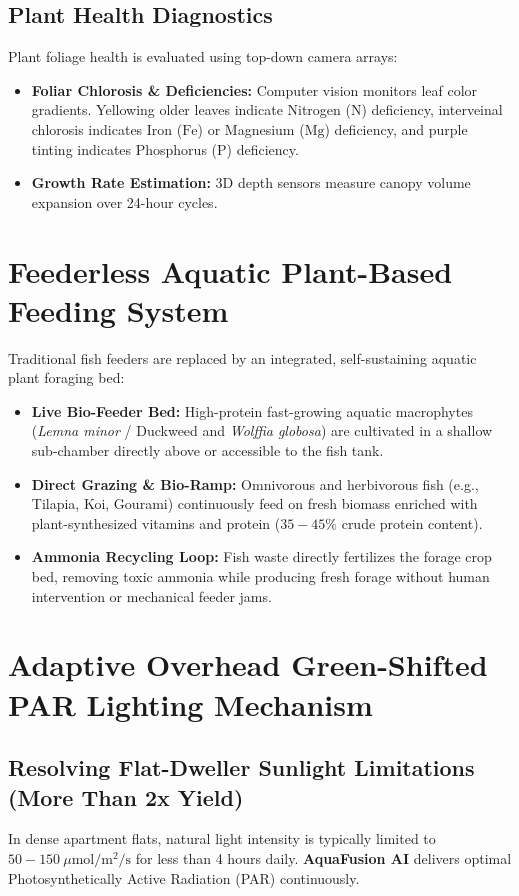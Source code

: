 \documentclass[12pt,a4paper]{article}
\begin{document}
\subsection{Plant Health Diagnostics}
Plant foliage health is evaluated using top-down camera arrays:
\begin{itemize}
    \item \textbf{Foliar Chlorosis \& Deficiencies:} Computer vision monitors leaf color gradients. Yellowing older leaves indicate Nitrogen ($\text{N}$) deficiency, interveinal chlorosis indicates Iron ($\text{Fe}$) or Magnesium ($\text{Mg}$) deficiency, and purple tinting indicates Phosphorus ($\text{P}$) deficiency.
    \item \textbf{Growth Rate Estimation:} 3D depth sensors measure canopy volume expansion over 24-hour cycles.
\end{itemize}

\section{Feederless Aquatic Plant-Based Feeding System}
Traditional fish feeders are replaced by an integrated, self-sustaining aquatic plant foraging bed:
\begin{itemize}
    \item \textbf{Live Bio-Feeder Bed:} High-protein fast-growing aquatic macrophytes (\textit{Lemna minor} / Duckweed and \textit{Wolffia globosa}) are cultivated in a shallow sub-chamber directly above or accessible to the fish tank.
    \item \textbf{Direct Grazing \& Bio-Ramp:} Omnivorous and herbivorous fish (e.g., Tilapia, Koi, Gourami) continuously feed on fresh biomass enriched with plant-synthesized vitamins and protein ($35-45\%$ crude protein content).
    \item \textbf{Ammonia Recycling Loop:} Fish waste directly fertilizes the forage crop bed, removing toxic ammonia while producing fresh forage without human intervention or mechanical feeder jams.
\end{itemize}

\section{Adaptive Overhead Green-Shifted PAR Lighting Mechanism}

\subsection{Resolving Flat-Dweller Sunlight Limitations (More Than 2x Yield)}
In dense apartment flats, natural light intensity is typically limited to $50-150\ \mu\text{mol}/\text{m}^2/\text{s}$ for less than 4 hours daily. \textbf{AquaFusion AI} delivers optimal Photosynthetically Active Radiation (PAR) continuously.
\end{document}
